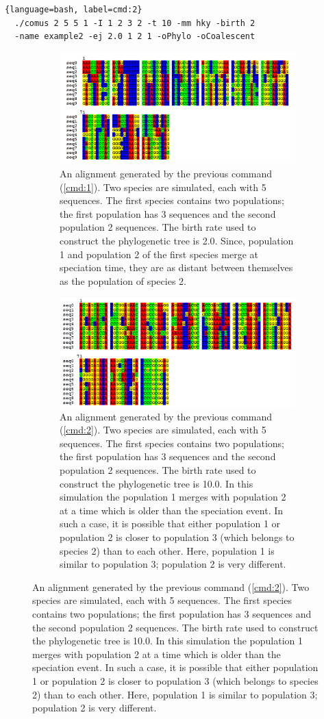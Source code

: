 \begin{lstlisting}[label=cmd:2, caption={Command line to produce the model of figure \ref{fig:3}}]{language=bash, label=cmd:2}
  ./comus 2 5 5 1 -I 1 2 3 2 -t 10 -mm hky -birth 2 
  -name example2 -ej 2.0 1 2 1 -oPhylo -oCoalescent
\end{lstlisting}

\begin{figure}[htbp!]

  \begin{subfigure}{\textwidth}
    \includegraphics[width=\textwidth]{alignment1.png}
    \caption{An alignment generated by the previous command (\ref{cmd:1}). Two species are simulated, each with 5 sequences. The first species contains two populations; the first population has 3 sequences and the second population 2 sequences. The birth rate used to construct the phylogenetic tree is 2.0. Since, population 1 and population 2 of the first species merge at speciation time, they are as distant between themselves as the population of species 2. }
    \label{fig:4}
  \end{subfigure}
  
  
  \begin{subfigure}{\textwidth}
    \includegraphics[width=\textwidth]{alignment2.png}
    \caption{An alignment generated by the previous command (\ref{cmd:2}). Two species are simulated, each with 5 sequences. The first species contains two populations; the first population has 3 sequences and the second population 2 sequences. The birth rate used to construct the phylogenetic tree is 10.0. In this simulation the population 1 merges with population 2 at a time which is older than the speciation event. In such a case, it is possible that either population 1 or population 2 is closer to population 3 (which belongs to species 2) than to each other. Here, population 1 is similar to population 3; population 2 is very different. }
    \label{fig:5}
  \end{subfigure}
\end{figure}
